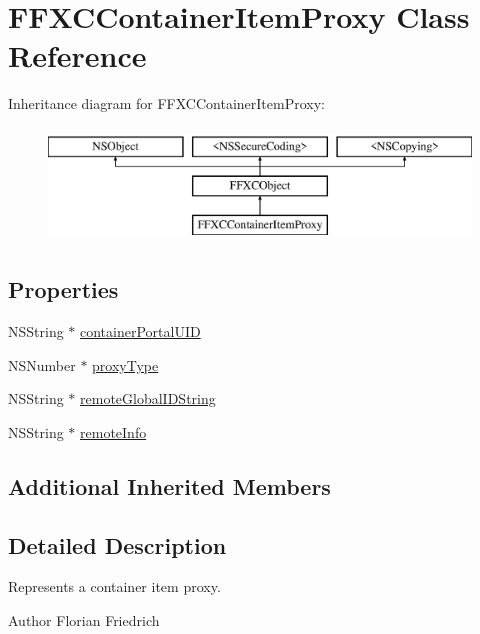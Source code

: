 \hypertarget{interface_f_f_x_c_container_item_proxy}{\section{F\-F\-X\-C\-Container\-Item\-Proxy Class Reference}
\label{interface_f_f_x_c_container_item_proxy}
}
Inheritance diagram for F\-F\-X\-C\-Container\-Item\-Proxy\-:\begin{figure}[H]
\begin{center}
\leavevmode
\includegraphics[height=3.000000cm]{interface_f_f_x_c_container_item_proxy}
\end{center}
\end{figure}
\subsection*{Properties}
\begin{DoxyCompactItemize}
\item 
N\-S\-String $\ast$ \hyperlink{interface_f_f_x_c_container_item_proxy_aa02cd3ee2eb93880a3830d685baa965d}{container\-Portal\-U\-I\-D}
\item 
N\-S\-Number $\ast$ \hyperlink{interface_f_f_x_c_container_item_proxy_ab53659713f28de95c27376b30f50b809}{proxy\-Type}
\item 
N\-S\-String $\ast$ \hyperlink{interface_f_f_x_c_container_item_proxy_ace2433d0dc8b4150e333218450b89ab4}{remote\-Global\-I\-D\-String}
\item 
N\-S\-String $\ast$ \hyperlink{interface_f_f_x_c_container_item_proxy_a5f8444241e9c286600c6ca079658a38f}{remote\-Info}
\end{DoxyCompactItemize}
\subsection*{Additional Inherited Members}


\subsection{Detailed Description}
Represents a container item proxy. \begin{DoxyAuthor}{Author}
Florian Friedrich 
\end{DoxyAuthor}


